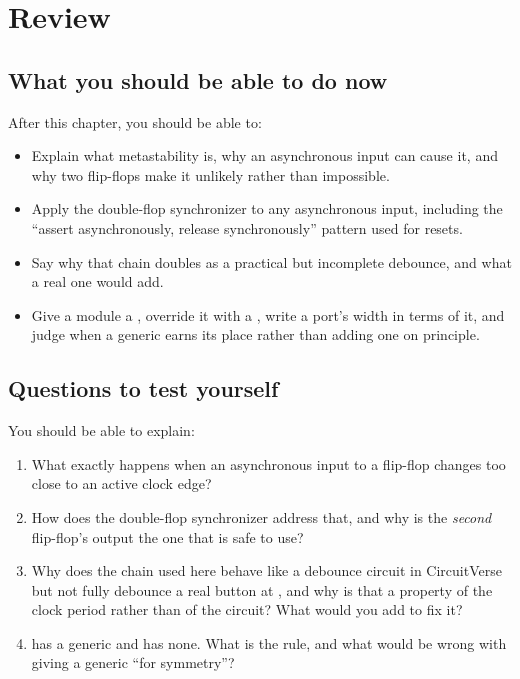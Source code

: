 
\section{Review}
\label{c4:sec:review}

\subsection*{What you should be able to do now}
After this chapter, you should be able to:
\begin{itemize}
  \item Explain what metastability is, why an asynchronous input can cause it, and why two
    flip-flops make it unlikely rather than impossible.
  \item Apply the double-flop synchronizer to any asynchronous input, including the ``assert
    asynchronously, release synchronously'' pattern used for resets.
  \item Say why that chain doubles as a practical but incomplete debounce, and what a real one would
    add.
  \item Give a module a , override it with a , write a port's width
    in terms of it, and judge when a generic earns its place rather than adding one on principle.
\end{itemize}

\subsection*{Questions to test yourself}
You should be able to explain:
\begin{enumerate}
  \item What exactly happens when an asynchronous input to a flip-flop changes too close to an
    active clock edge?
  \item How does the double-flop synchronizer address that, and why is the \emph{second}
    flip-flop's output the one that is safe to use?
  \item Why does the chain used here behave like a debounce circuit in CircuitVerse but not fully
    debounce a real button at , and why is that a property of the clock period rather
    than of the circuit? What would you add to fix it?
  \item {} has a generic and  has none. What is the rule, and what
    would be wrong with giving  a  generic ``for symmetry''?
\end{enumerate}

